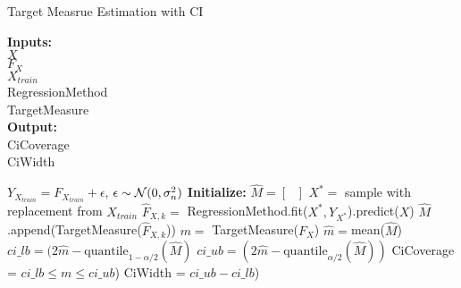 \begin{algorithm}[h!] \caption{Target Measrue Estimation with CI}
 \hspace*{\algorithmicindent} \textbf{Inputs:} \\
 \hspace*{\algorithmicindent} $X$  \\
 \hspace*{\algorithmicindent} $F_X$   \\
 \hspace*{\algorithmicindent} $X_{train}$  \\
 \hspace*{\algorithmicindent} RegressionMethod  \\
 \hspace*{\algorithmicindent} TargetMeasure  \\
 \hspace*{\algorithmicindent} \textbf{Output:} \\
 \hspace*{\algorithmicindent} CiCoverage \\
 \hspace*{\algorithmicindent} CiWidth \\
\begin{algorithmic}[1]
    \State $Y_{X_{train}} = F_{X_{train}} + \epsilon$, $\epsilon \sim  \operatorname{\mathcal{N}}(0, \sigma_n^2)$
    \State \textbf{Initialize:} $\hat{M} = \left[ \text{ } \right]$
        \State $X^{\ast} = $ sample with replacement from $X_{train}$
        \State $\hat{F}_{X,k} = $ RegressionMethod.fit($X^{\ast}, Y_{X^{\ast}}$).predict($X$)
        \State $\hat{M}$.append(TargetMeasure($\hat{F}_{X, k}$)) 
    \EndFor
    \State $m =$ TargetMeasure($F_X$) 
    \State $\hat{m} = $mean($\hat{M}$)
    \State $ci\_lb = (2\hat{m} - \text{quantile}_{1-\alpha/2}(\hat{M})$ 
    \State $ci\_ub = (2\hat{m} - \text{quantile}_{\alpha/2}(\hat{M}))$ 
    \State CiCoverage = $ ci\_lb \leq m \leq ci\_ub$)
    \State CiWidth = $ci\_ub - ci\_lb $)
\end{algorithmic}
\end{algorithm}\label{pc:target-measure-baseline}




